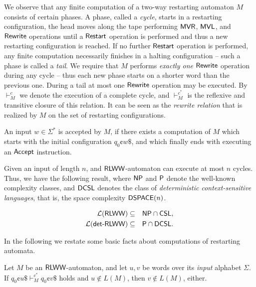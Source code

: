 We observe that any finite computation of a two-way restarting automaton $M$ consists of certain phases. A phase, called a \emph{cycle}, starts in a restarting configuration, the head moves along the tape performing $\textup{\sf MVR}$, $\textup{\sf MVL}$, and \index{$\Rewrite$}$\Rewrite$ operations until a $\textup{\sf Restart}$ operation is performed and thus a new restarting configuration is reached. If no further $\textup{\sf Restart}$ operation is performed, any finite computation necessarily finishes in a halting configuration -- such a phase is called a \emph{tail}. We require that $M$ performs \emph{exactly one} \index{$\Rewrite$}$\Rewrite$ operation during any cycle -- thus each new phase starts on a shorter word than the previous one. During a tail at most one \index{$\Rewrite$}$\Rewrite$ operation may be executed. By $\vdash_M^c$ we denote the execution of a complete cycle, and $\vdash_M^{c^*}$ is the reflexive and transitive closure of this relation. It can be seen as the \emph{rewrite relation} that is realized by $M$ on the set of restarting configurations.

An input $w \in \Sigma^*$ is accepted by $M$, if there exists a computation of $M$ which starts with the initial configuration  $q_0 \cent w \$$, and which finally ends with executing an $\textup{\sf Accept}$ instruction.

Given an input of length $n$, and $\textup{\sf RLWW}$-automaton can execute at most $n$ cycles. Thus, we have the following result, where $\textup{\sf NP}$ and $\textup{\sf P}$ denote the well-known complexity classes, and $\textup{\sf DCSL}$ denotes the class of \emph{deterministic context-sensitive languages}, that is, the space complexity $\textup{\sf DSPACE}(n)$.

\begin{proposition}
\begin{eqnarray*}
{\cal L}(\textup{\sf RLWW}) & \subseteq & \textup{\sf NP} \cap \textup{\sf CSL},\\
{\cal L}(\textup{\sf det-RLWW}) & \subseteq & \textup{\sf P} \cap \textup{\sf DCSL}.
\end{eqnarray*}
\end{proposition}

In the following we restate some basic facts about computations of restarting automata.

\begin{proposition}\label{proposition:error-preserving-rlww}
Let $M$ be an $\textup{\sf RLWW}$-automaton, and let $u, v$ be words over its \emph{input} alphabet $\Sigma$. If $q_0 \cent u \$ \vdash_M^{c^*} q_0 \cent v \$$ holds and $u \notin L(M)$, then $v \notin L(M)$, either.
\end{proposition}

